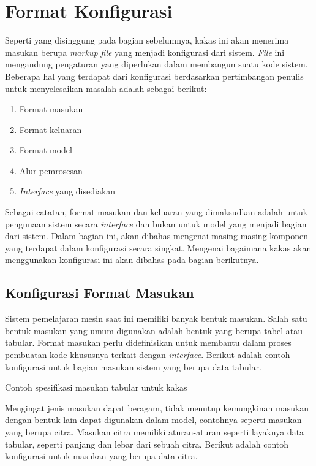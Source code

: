 \section{Format Konfigurasi}

Seperti yang disinggung pada bagian sebelumnya, kakas ini akan menerima masukan berupa \textit{markup file} yang menjadi konfigurasi dari sistem.
\textit{File} ini mengandung pengaturan yang diperlukan dalam membangun suatu kode sistem.
Beberapa hal yang terdapat dari konfigurasi berdasarkan pertimbangan penulis untuk menyelesaikan masalah adalah sebagai berikut:

\begin{enumerate}
	\item Format masukan
	\item Format keluaran
	\item Format model
	\item Alur pemrosesan
	\item \textit{Interface} yang disediakan
\end{enumerate}

Sebagai catatan, format masukan dan keluaran yang dimaksudkan adalah untuk pengunaan sistem secara \textit{interface} dan bukan untuk model yang menjadi bagian dari sistem.
Dalam bagian ini, akan dibahas mengenai masing-masing komponen yang terdapat dalam konfigurasi secara singkat.
Mengenai bagaimana kakas akan menggunakan konfigurasi ini akan dibahas pada bagian berikutnya.

\subsection{Konfigurasi Format Masukan}\label{section:03-input-format}

Sistem pemelajaran mesin saat ini memiliki banyak bentuk masukan.
Salah satu bentuk masukan yang umum digunakan adalah bentuk yang berupa tabel atau tabular.
Format masukan perlu didefinisikan untuk membantu dalam proses pembuatan kode khususnya terkait dengan \textit{interface}.
Berikut adalah contoh konfigurasi untuk bagian masukan sistem yang berupa data tabular.

\begin{listing}[H]
	\caption{Contoh spesifikasi masukan tabular untuk kakas}
	\label{listing:1}
\end{listing}

Mengingat jenis masukan dapat beragam, tidak menutup kemungkinan masukan dengan bentuk lain dapat digunakan dalam model, contohnya seperti masukan yang berupa citra.
Masukan citra memiliki aturan-aturan seperti layaknya data tabular, seperti panjang dan lebar dari sebuah citra.
Berikut adalah contoh konfigurasi untuk masukan yang berupa data citra.

